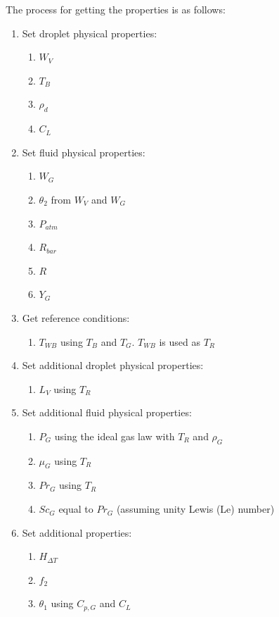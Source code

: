 \documentclass[../Interim_Report_Master]{subfiles}
\begin{document}
The process for getting the properties is as follows:
\begin{enumerate}
	\item Set droplet physical properties:
		\begin{enumerate}
			\item $W_V$
			\item $T_B$
			\item $\rho_d$
			\item $C_L$
		\end{enumerate}
	\item Set fluid physical properties:
		\begin{enumerate}
			\item $W_G$
			\item $\theta_2$ from $W_V$ and $W_G$
			\item $P_{atm}$
			\item $R_{bar}$
			\item $R$
			\item $Y_G$
		\end{enumerate}
	\item Get reference conditions:
		\begin{enumerate}
			\item $T_{WB}$ using $T_B$ and $T_G$. $T_{WB}$ is used as $T_R$
		\end{enumerate}
	\item Set additional droplet physical properties:
		\begin{enumerate}
			\item $L_V$ using $T_R$
		\end{enumerate}
	\item Set additional fluid physical properties:
		\begin{enumerate}
			\item $P_G$ using the ideal gas law with $T_R$ and $\rho_G$
			\item $\mu_G$ using $T_R$
			\item $Pr_G$ using $T_R$
			\item $Sc_G$ equal to $Pr_G$ (assuming unity Lewis (Le) number)
		\end{enumerate}
	\item Set additional properties:
		\begin{enumerate}
			\item $H_{\Delta T}$ 
			\item $f_2$
			\item $\theta_1$ using $C_{p,G}$ and $C_L$
		\end{enumerate}	
\end{enumerate}
\end{document}
